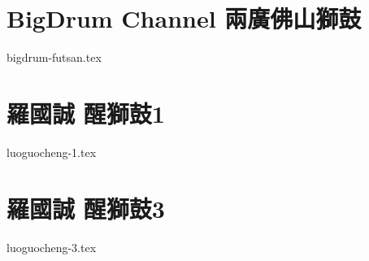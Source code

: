 \documentclass[11pt]{article}
\begin{document}
\section*{BigDrum Channel 兩廣佛山獅鼓}
{bigdrum-futsan.tex}
\section*{羅國誠 醒獅鼓1}
{luoguocheng-1.tex}
\section*{羅國誠 醒獅鼓3}
{luoguocheng-3.tex}
\end{document}
